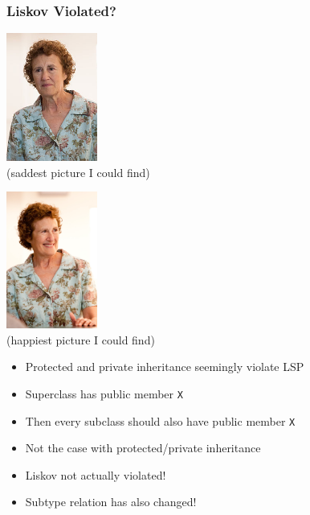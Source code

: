 \documentclass{../ucll-slides}
\begin{document}
\begin{frame}
  \frametitle{Liskov Violated?}
  \begin{overprint}
    \begin{center}
      \includegraphics[width=3cm]{sad-liskov.jpg} \\
      \tiny (saddest picture I could find)
    \end{center}
    \begin{center}
      \includegraphics[width=3cm]{happy-liskov.jpg} \\
      \tiny (happiest picture I could find)
    \end{center}
  \end{overprint}
  \vskip5mm
  \begin{overprint}
    \begin{itemize}
      \item Protected and private inheritance seemingly violate LSP
      \item Superclass has public member {\tt X}
      \item Then every subclass should also have public member {\tt X}
      \item Not the case with protected/private inheritance
    \end{itemize}

    \begin{itemize}
      \item Liskov not actually violated!
      \item Subtype relation has also changed!
    \end{itemize}
  \end{overprint}
\end{frame}
\end{document}
